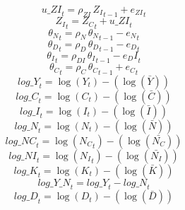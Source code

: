\begin{dmath}
{u\_ZI}_{t}={{\rho_{ZI}}}\, {{Z_I}}_{t-1}+{{e_{ZI}}}_{t}
\end{dmath}
\begin{dmath}
{{Z_I}}_{t}={{Z_C}}_{t}+{u\_ZI}_{t}
\end{dmath}
\begin{dmath}
{{\theta_N}}_{t}={{\rho_N}}\, {{\theta_N}}_{t-1}-{{e_N}}_{t}
\end{dmath}
\begin{dmath}
{{\theta_D}}_{t}={{\rho_D}}\, {{\theta_D}}_{t-1}-{{e_D}}_{t}
\end{dmath}
\begin{dmath}
{{\theta_I}}_{t}={{\rho_{DI}}}\, {{\theta_I}}_{t-1}-{{e_DI}}_{t}
\end{dmath}
\begin{dmath}
{{\theta_C}}_{t}={{\rho_C}}\, {{\theta_C}}_{t-1}+{{e_C}}_{t}
\end{dmath}
\begin{dmath}
{log\_Y}_{t}=\log\left({{Y}}_{t}\right)-(\log\left(\bar{{Y}}\right))
\end{dmath}
\begin{dmath}
{log\_C}_{t}=\log\left({{C}}_{t}\right)-(\log\left(\bar{{C}}\right))
\end{dmath}
\begin{dmath}
{log\_I}_{t}=\log\left({{I}}_{t}\right)-(\log\left(\bar{{I}}\right))
\end{dmath}
\begin{dmath}
{log\_N}_{t}=\log\left({{N}}_{t}\right)-(\log\left(\bar{{N}}\right))
\end{dmath}
\begin{dmath}
{log\_NC}_{t}=\log\left({{N_C}}_{t}\right)-(\log\left(\bar{{N_C}}\right))
\end{dmath}
\begin{dmath}
{log\_NI}_{t}=\log\left({{N_I}}_{t}\right)-(\log\left(\bar{{N_I}}\right))
\end{dmath}
\begin{dmath}
{log\_K}_{t}=\log\left({{K}}_{t}\right)-(\log\left(\bar{{K}}\right))
\end{dmath}
\begin{dmath}
{log\_Y\_N}_{t}={log\_Y}_{t}-{log\_N}_{t}
\end{dmath}
\begin{dmath}
{log\_D}_{t}=\log\left({{D}}_{t}\right)-(\log\left(\bar{{D}}\right))
\end{dmath}
